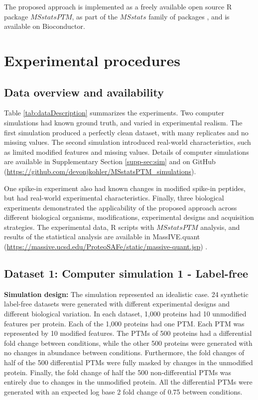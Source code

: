 \documentclass[mcp]{article}
\numberwithin{table}{section}
\begin{document}
The proposed approach is implemented as a freely available open source R package $MSstatsPTM$, as part of the $MSstats$ family of packages \cite{Choi:2014,Huang:2020}, and is available on Bioconductor.

\section{Experimental procedures}

\subsection*{Data overview and availability}

Table \ref{tab:dataDescription} summarizes the experiments. Two computer simulations had known ground truth, and varied in experimental realism. The first simulation produced a perfectly clean dataset, with many replicates and no missing values. The second simulation introduced real-world characteristics, such as limited modified features and missing values. Details of computer simulations are available in Supplementary Section \ref{supp-sec:sim} and on GitHub (\url{https://github.com/devonjkohler/MSstatsPTM_simulations}).

One spike-in experiment also had known changes in modified spike-in peptides, but had real-world experimental characteristics. Finally, three biological experiments demonstrated the applicability of the proposed approach across different biological organisms, modifications, experimental designs and acquisition strategies. The experimental data, R scripts with $MSstatsPTM$ analysis, and results of the statistical analysis are available in MassIVE.quant (\url{https://massive.ucsd.edu/ProteoSAFe/static/massive-quant.jsp}) \cite{Choi:2020}. 

\subsection*{Dataset 1: Computer simulation 1 - Label-free}
\label{sec:comp_sim_procedure1}

{\bf Simulation design:} The simulation represented an idealistic case. 24 synthetic label-free datasets were generated with different experimental designs and different biological variation. In each dataset, 1,000 proteins had 10 unmodified features per protein. Each of the 1,000 proteins had one PTM. Each PTM was represented by 10 modified features. The PTMs of 500 proteins had a differential fold change between conditions, while the other 500 proteins were generated with no changes in abundance between conditions. Furthermore, the fold changes of half of the 500 differential PTMs were fully masked by changes in the unmodified protein. Finally, the fold change of half the 500 non-differential PTMs was entirely due to changes in the unmodified protein. All the differential PTMs were generated with an expected log base 2 fold change of 0.75 between conditions. 
\end{document}
